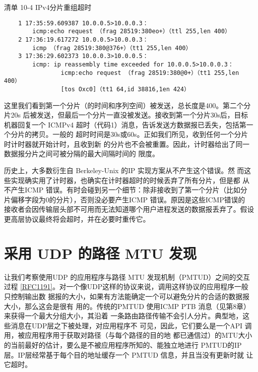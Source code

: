 清单 10-4 IPv4分片重组超时

\begin{verbatim}
    1 17:35:59.609387 10.0.0.5>10.0.0.3：
        icmp:echo request （frag 28519:380eo+）（ttl 255,len 400）
    2 17:36:19.617272 10.0.0.5>10.0.0.3：
        icmp （frag 28519:380@376+）（tt1 255,len 400）
    3 17:36:29.602373 10.0.0.3>10.0.0.5：
        icmp: ip reassembly time exceeded for 10.0.0.5>10.0.0.3：
                icmp:echo request （frag 28519:380@0+）（tt1 255,len 400）
                [tos Oxc0]（tt1 64,id 38816,1en 424）
\end{verbatim}

这里我们看到第一个分片（的时间和序列空间）被发送，总长度是400。第二个分片20s
后被发送，但最后一个分片一直没被发送。接收到第一个分片30s后，目标机器回复一个
ICMPv4 超时（代码1）消息，告诉发送方数据报已丢失，包括第一个分片的拷贝。一般的
超时时间是30s或60s。正如我们所见，收到任何一个分片时计时器就开始计时，且收到新
的分片也不会被重置。因此，计时器给出了同一数据报分片之间可被分隔的最大间隔时间的
限度。

\begin{tcolorbox}    
    历史上，大多数衍生自 Berkeley-Unix 的IP 实现方案从不产生这个错误。然
    而这些实现确实用了计时器，也确实在计时器超时的时候丢弃了所有分片，但是都
    从不产生ICMP 错误。有时会碰到另一个细节：除非接收到了第一个分片（比如分
    片偏移字段为0的分片），否则没必要产生ICMP 错误。原因是这些ICMP错误的
    接收者会因传输层头部不可用而无法知道哪个用户进程发送的数据报丢弃了。假设
    更高层协议最终将会超时，并在必要时重传它。
\end{tcolorbox}

\section{采用 UDP 的路径 MTU 发现}

让我们考察使用UDP 的应用程序与路径 MTU 发现机制（PMTUD）之间的交互过程
\href{https://www.rfc-editor.org/rfc/rfc1191}{[RFC1191]}。对一个像UDP这样的协议来说，调用这样协议的应用程序一般只控制输出数
据报的大小，如果有方法能确定一个可以避免分片的合适的数据报大小，那么这会是很有
用的。传统的PMTUD 使用ICMP PTB 消息（见第8章）来获得一个最大分组大小，其沿着
一条路由路径传输不会引人分片。典型地，这些消息在UDP层之下被处理，对应用程序不
可见，因此，它们要么是一个API 调用，被应用程序用于获取对路径（与每个路径的目的地
都已通信过）的MTU大小的当前最好的估计，要么是不被应用程序所知的、能独立地进行
PMTUD的IP层。IP层经常基于每个目的地址缓存一个 PMTUD 信息，并且当没有更新时就
让它超时。

